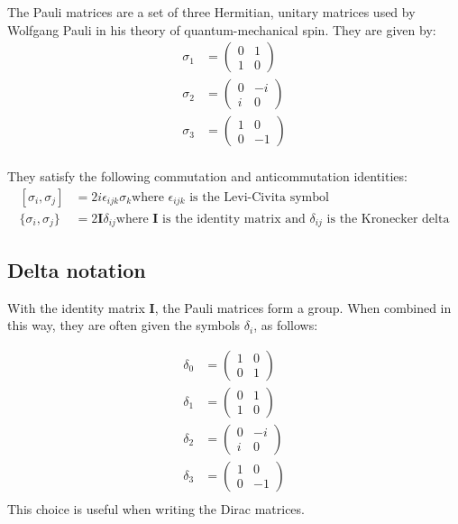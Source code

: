 \documentclass[12pt]{article}
\begin{document}
The Pauli matrices are a set of three Hermitian, unitary matrices used by Wolfgang Pauli in his theory of quantum-mechanical spin. They are given by:
\begin{align*}
\sigma_1 &= \begin{pmatrix} 0 & 1\\
                            1 & 0
            \end{pmatrix}\\
\sigma_2 &= \begin{pmatrix} 0 & -i\\
                            i & 0
            \end{pmatrix}\\
\sigma_3 &= \begin{pmatrix} 1 & 0\\
                            0 & -1
            \end{pmatrix}\\
\end{align*}

They satisfy the following commutation and anticommutation identities:
\begin{align*}
\left[ \sigma_i, \sigma_j \right] &= 2i\epsilon_{ijk} \sigma_k\text{where $\epsilon_{ijk}$ is the Levi-Civita symbol}\\
\lbrace \sigma_i, \sigma_j \rbrace &=2 \mathbf{I} \delta_{ij} \text{where $\mathbf{I}$ is the identity matrix and $\delta_{ij}$ is the Kronecker delta}
\end{align*}

\subsection{Delta notation}
With the identity matrix $\textbf{I}$, the Pauli matrices form a group. When combined in this way, they are often given the symbols $\delta_i$, as follows:

\begin{align*}
\delta_0 &= \begin{pmatrix} 1 & 0\\
                            0 & 1
            \end{pmatrix}\\
\delta_1 &= \begin{pmatrix} 0 & 1\\
                            1 & 0
            \end{pmatrix}\\
\delta_2 &= \begin{pmatrix} 0 & -i\\
                            i & 0
            \end{pmatrix}\\
\delta_3 &= \begin{pmatrix} 1 & 0\\
                            0 & -1
            \end{pmatrix}\\
\end{align*}
This choice is useful when writing the Dirac matrices.
\end{document}
